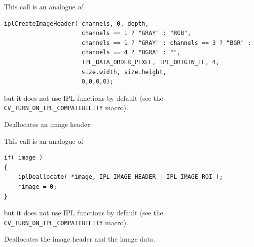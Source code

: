 \begin{description}
\end{description}

This call is an analogue of

\begin{lstlisting}
iplCreateImageHeader( channels, 0, depth,
                      channels == 1 ? "GRAY" : "RGB",
                      channels == 1 ? "GRAY" : channels == 3 ? "BGR" :
                      channels == 4 ? "BGRA" : "",
                      IPL_DATA_ORDER_PIXEL, IPL_ORIGIN_TL, 4,
                      size.width, size.height,
                      0,0,0,0);
\end{lstlisting}

but it does not use IPL functions by default (see the \texttt{CV\_TURN\_ON\_IPL\_COMPATIBILITY} macro).

\ifC

\label{ReleaseImageHeader}

Deallocates an image header.


\begin{description}
\end{description}

This call is an analogue of

\begin{lstlisting}
if( image )
{
    iplDeallocate( *image, IPL_IMAGE_HEADER | IPL_IMAGE_ROI );
    *image = 0;
}
\end{lstlisting}

but it does not use IPL functions by default (see the \texttt{CV\_TURN\_ON\_IPL\_COMPATIBILITY} macro).

\label{ReleaseImage}

Deallocates the image header and the image data.


\begin{description}
\end{description}

